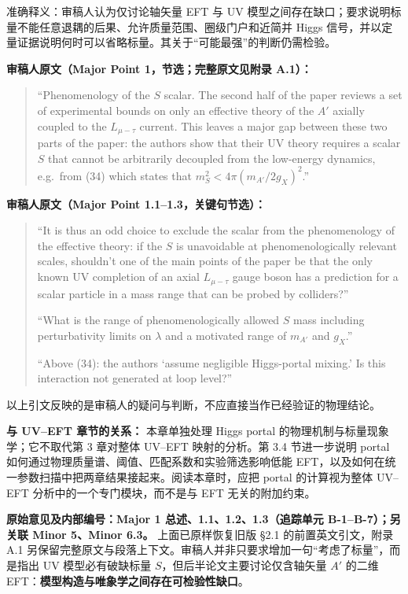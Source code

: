 \documentclass[
]{article}
\begin{document}
准确释义：审稿人认为仅讨论轴矢量 EFT 与 UV
模型之间存在缺口；要求说明标量不能任意退耦的后果、允许质量范围、圈级门户和近简并
Higgs
信号，并以定量证据说明何时可以省略标量。其关于``可能最强''的判断仍需检验。

\textbf{审稿人原文（Major Point 1，节选；完整原文见附录 A.1）：}

\begin{quote}
``Phenomenology of the \(S\) scalar. The second half of the paper
reviews a set of experimental bounds on only an effective theory of the
\(A'\) axially coupled to the \(L_{\mu-\tau}\) current. This leaves a
major gap between these two parts of the paper: the authors show that
their UV theory requires a scalar \(S\) that cannot be arbitrarily
decoupled from the low-energy dynamics, e.g.~from (34) which states that
\(m_S^2 < 4\pi(m_{A'}/2g_X)^2\).''
\end{quote}

\textbf{审稿人原文（Major Point 1.1--1.3，关键句节选）：}

\begin{quote}
``It is thus an odd choice to exclude the scalar from the phenomenology
of the effective theory: if the \(S\) is unavoidable at
phenomenologically relevant scales, shouldn't one of the main points of
the paper be that the only known UV completion of an axial
\(L_{\mu-\tau}\) gauge boson has a prediction for a scalar particle in a
mass range that can be probed by colliders?''

``What is the range of phenomenologically allowed \(S\) mass including
perturbativity limits on \(\lambda\) and a motivated range of \(m_{A'}\)
and \(g_X\).''

``Above (34): the authors `assume negligible Higgs-portal mixing.' Is
this interaction not generated at loop level?''
\end{quote}

以上引文反映的是审稿人的疑问与判断，不应直接当作已经验证的物理结论。

\textbf{与 UV--EFT 章节的关系：} 本章单独处理 Higgs portal
的物理机制与标量现象学；它不取代第 3 章对整体 UV--EFT 映射的分析。第 3.4
节进一步说明 portal 如何通过物理质量谱、阈值、匹配系数和实验筛选影响低能
EFT，以及如何在统一参数扫描中把两章结果接起来。阅读本章时，应把 portal
的计算视为整体 UV--EFT 分析中的一个专门模块，而不是与 EFT
无关的附加约束。

\textbf{原始意见及内部编号：Major 1 总述、1.1、1.2、1.3（追踪单元
B-1--B-7）；另关联 Minor 5、Minor 6.3。} 上面已原样恢复旧版 §2.1
的前置英文引文，附录 A.1
另保留完整原文与段落上下文。审稿人并非只要求增加一句``考虑了标量''，而是指出
UV 模型必有破缺标量 \(S\)，但后半论文主要讨论仅含轴矢量 \(A'\) 的二维
EFT：\textbf{模型构造与唯象学之间存在可检验性缺口}。
\end{document}
